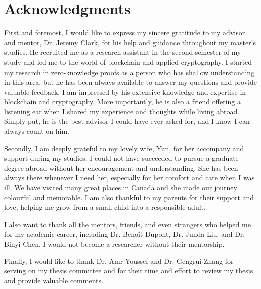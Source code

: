 
\chapter*{Acknowledgments}

First and foremost, I would like to express my sincere gratitude to my advisor and mentor, Dr. Jeremy Clark, for his help and guidance throughout my master's studies. He recruited me as a research assistant in the second semester of my study and led me to the world of blockchain and applied cryptography. I started my research in zero-knowledge proofs as a person who has shallow understanding in this area, but he has been always available to answer my questions and provide valuable feedback. I am impressed by his extensive knowledge and expertise in blockchain and cryptography. More importantly, he is also a friend offering a listening ear when I shared my experience and thoughts while living abroad. Simply put, he is the best advisor I could have ever asked for, and I know I can always count on him.

Secondly, I am deeply grateful to my lovely wife, Yun, for her accompany and support during my studies. I could not have succeeded to pursue a graduate degree abroad without her encouragement and understanding. She has been always there whenever I need her, especially for her comfort and care when I was ill. We have visited many great places in Canada and she made our journey colourful and memorable. I am also thankful to my parents for their support and love, helping me grow from a small child into a responsible adult.

I also want to thank all the mentors, friends, and even strangers who helped me for my academic career, including Dr. Benoît Dupont, Dr. Junda Liu, and Dr. Binyi Chen. I would not become a researcher without their mentorship.

Finally, I would like to thank Dr. Amr Youssef and Dr. Gengrui Zhang for serving on my thesis committee and for their time and effort to review my thesis and provide valuable comments.
